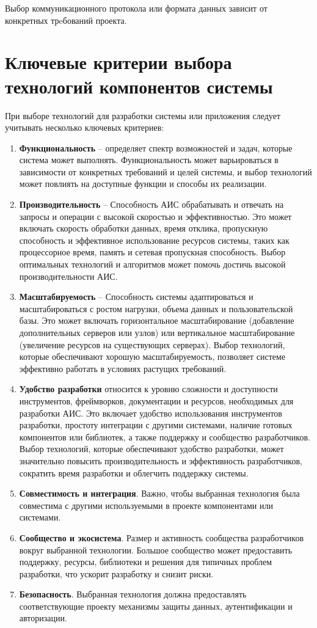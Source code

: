Выбор коммуникационного протокола или формата данных зависит от конкретных трeбований проекта.



\section{Ключевые критерии выбора технологий компонентов системы}
При выборе технологий для разработки системы или приложения следует учитывать несколько ключевых критериев:

\begin{enumerate}
    \item \textbf{Функциональность} -- определяет спектр возможностей и задач, которые система может выполнять. 
    Функциональность может варьироваться в зависимости от конкретных требований и целей системы,
    и выбор технологий может повлиять на доступные функции и способы их реализации.
    \item \textbf{Производительность} -- Способность АИС обрабатывать и отвечать на запросы и операции с высокой скоростью и эффективностью.
    Это может включать скорость обработки данных, время отклика, 
    пропускную способность и эффективное использование ресурсов системы, 
    таких как процессорное время, память и сетевая пропускная способность. 
    Выбор оптимальных технологий и алгоритмов может помочь достичь высокой производительности АИС.
    \item \textbf{Масштабируемость} -- Способность системы адаптироваться и масштабироваться с ростом нагрузки, объема данных и пользовательской базы. 
    Это может включать горизонтальное масштабирование (добавление дополнительных серверов или узлов) или вертикальное масштабирование (увеличение ресурсов на существующих серверах). 
    Выбор технологий, которые обеспечивают хорошую масштабируемость, позволяет системе эффективно работать в условиях растущих требований.
    \item \textbf{Удобство разработки} относится к уровню сложности и доступности инструментов, 
    фреймворков, документации и ресурсов, необходимых для разработки АИС. 
    Это включает удобство использования инструментов разработки, простоту интеграции с другими системами, наличие готовых компонентов или библиотек, 
    а также поддержку и сообщество разработчиков. Выбор технологий, которые обеспечивают удобство разработки, 
    может значительно повысить производительность и эффективность разработчиков, сократить время разработки и облегчить поддержку системы.
    \item \textbf{Совместимость и интеграция}. Важно, чтобы выбранная технология была совместима с другими используемыми в проекте компонентами или системами. 
    \item \textbf{Сообщество и экосистема}. Размер и активность сообщества разработчиков вокруг выбранной технологии. 
    Большое сообщество может предоставить поддержку, ресурсы, библиотеки и решения для типичных проблем разработки, что ускорит разработку и снизит риски.
    \item \textbf{Безопасность}. Выбранная технология должна предоставлять соответствующие проекту механизмы защиты данных, аутентификации и авторизации.
\end{enumerate}

